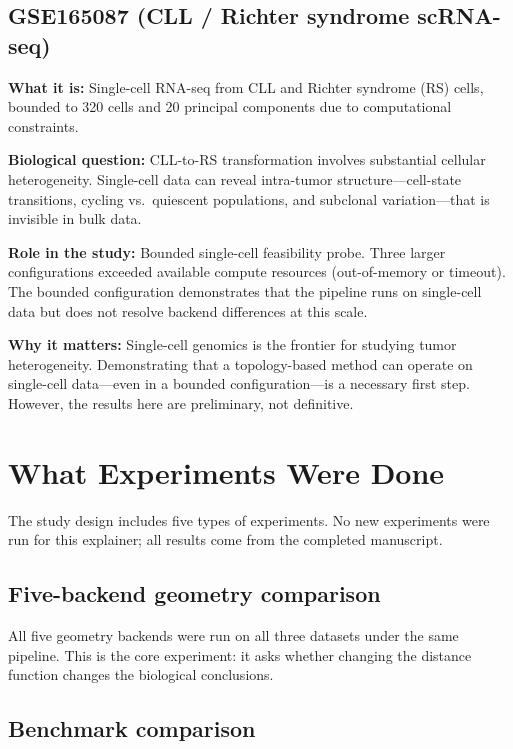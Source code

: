 \documentclass[11pt]{article}
\begin{document}
\subsection{GSE165087 (CLL / Richter syndrome scRNA-seq)}

\textbf{What it is:} Single-cell RNA-seq from CLL and Richter syndrome (RS) cells, bounded to 320 cells and 20 principal components due to computational constraints.

\textbf{Biological question:} CLL-to-RS transformation involves substantial cellular heterogeneity.
Single-cell data can reveal intra-tumor structure---cell-state transitions, cycling vs.\ quiescent populations, and subclonal variation---that is invisible in bulk data.

\textbf{Role in the study:} Bounded single-cell feasibility probe.
Three larger configurations exceeded available compute resources (out-of-memory or timeout).
The bounded configuration demonstrates that the pipeline runs on single-cell data but does not resolve backend differences at this scale.

\textbf{Why it matters:} Single-cell genomics is the frontier for studying tumor heterogeneity.
Demonstrating that a topology-based method can operate on single-cell data---even in a bounded configuration---is a necessary first step.
However, the results here are preliminary, not definitive.

\section{What Experiments Were Done}
\label{sec:experiments}

The study design includes five types of experiments.
No new experiments were run for this explainer; all results come from the completed manuscript.

\subsection{Five-backend geometry comparison}

All five geometry backends were run on all three datasets under the same pipeline.
This is the core experiment: it asks whether changing the distance function changes the biological conclusions.

\subsection{Benchmark comparison}
\end{document}
